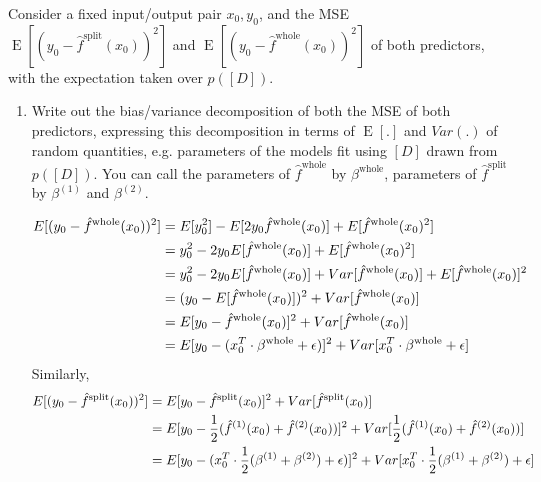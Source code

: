 \documentclass[11pt]{article}
\DeclareMathOperator{\E}{E}
\begin{document}
Consider a fixed input/output pair $x_0,y_0$, and the MSE $\E[(y_0 - \hat{f}^{\text{split}}(x_0))^2]$ and $\E[(y_0 - \hat{f}^{\text{whole}}(x_0))^2]$ of both predictors, with the expectation taken over $p([D])$.
\begin{enumerate}
\item Write out the bias/variance decomposition of both the MSE of both predictors, expressing this decomposition in terms of $\E[.]$ and $Var(.)$ of random quantities, e.g. parameters of the models fit using $[D]$ drawn from $p([D])$.  You can call the parameters of $\hat{f}^{\text{whole}}$ by $\beta^{\text{whole}}$, parameters of $\hat{f}^{\text{split}}$ by $\beta^{(1)}$ and $\beta^{(2)}$.

\begin{answertext}{10cm}{}  

\begin{align}
E[(y_{0} - \hat{f}^{\text{whole}}(x_{0}))^{2}] &= E[y_{0}^{2}] - E[2y_{0}\hat{f}^{\text{whole}}(x_{0})] + E[\hat{f}^{\text{whole}}(x_{0})^{2}] \notag\\
&= y_{0}^{2} - 2y_{0}E[\hat{f}^{\text{whole}}(x_{0})] + E[\hat{f}^{\text{whole}}(x_{0})^{2}] \notag\\
&= y_{0}^{2} - 2y_{0}E[\hat{f}^{\text{whole}}(x_{0})] + Var[\hat{f}^{\text{whole}}(x_{0})] + E[\hat{f}^{\text{whole}}(x_{0})]^{2} \notag\\
&= (y_{0} - E[\hat{f}^{\text{whole}}(x_{0})])^{2} + Var[\hat{f}^{\text{whole}}(x_{0})] \notag\\
&= E[y_{0} - \hat{f}^{\text{whole}}(x_{0})]^{2} + Var[\hat{f}^{\text{whole}}(x_{0})] \notag\\
&= E[y_{0} - (x_{0}^{T}\cdot\beta^{\text{whole}} + \epsilon)]^{2} + Var[x_{0}^{T}\cdot\beta^{\text{whole}} + \epsilon] \notag
\end{align}
Similarly,
\begin{align}
E[(y_{0} - \hat{f}^{\text{split}}(x_{0}))^{2}] &= E[y_{0} - \hat{f}^{\text{split}}(x_{0})]^{2} + Var[\hat{f}^{\text{split}}(x_{0})] \notag\\
&= E[y_{0} - \frac{1}{2}(\hat{f}^{(1)}(x_{0}) + \hat{f}^{(2)}(x_{0}))]^{2} + Var[\frac{1}{2}(\hat{f}^{(1)}(x_{0}) + \hat{f}^{(2)}(x_{0}))] \notag\\
&= E[y_{0} - (x_{0}^{T}\cdot\frac{1}{2}(\beta^{(1)} + \beta^{(2)}) + \epsilon)]^{2} + Var[x_{0}^{T}\cdot\frac{1}{2}(\beta^{(1)} + \beta^{(2)}) + \epsilon] \notag
\end{align}

\end{answertext} 


\end{enumerate}
\end{document}
